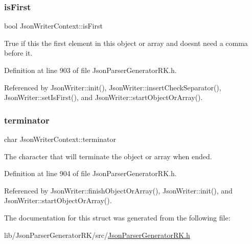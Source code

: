 \subsubsection{\texorpdfstring{is\+First}{isFirst}}
{\footnotesize\ttfamily bool Json\+Writer\+Context\+::is\+First}



True if this the first element in this object or array and doesn\textquotesingle{}t need a comma before it. 



Definition at line 903 of file Json\+Parser\+Generator\+R\+K.\+h.



Referenced by Json\+Writer\+::init(), Json\+Writer\+::insert\+Check\+Separator(), Json\+Writer\+::set\+Is\+First(), and Json\+Writer\+::start\+Object\+Or\+Array().

\mbox{\label{struct_json_writer_context_ae37822121661863a0d70776b48cc3962}} 
\subsubsection{\texorpdfstring{terminator}{terminator}}
{\footnotesize\ttfamily char Json\+Writer\+Context\+::terminator}



The character that will terminate the object or array when ended. 



Definition at line 904 of file Json\+Parser\+Generator\+R\+K.\+h.



Referenced by Json\+Writer\+::finish\+Object\+Or\+Array(), Json\+Writer\+::init(), and Json\+Writer\+::start\+Object\+Or\+Array().



The documentation for this struct was generated from the following file\+:\begin{DoxyCompactItemize}
\item 
lib/\+Json\+Parser\+Generator\+R\+K/src/\hyperlink{_json_parser_generator_r_k_8h}{Json\+Parser\+Generator\+R\+K.\+h}\end{DoxyCompactItemize}
